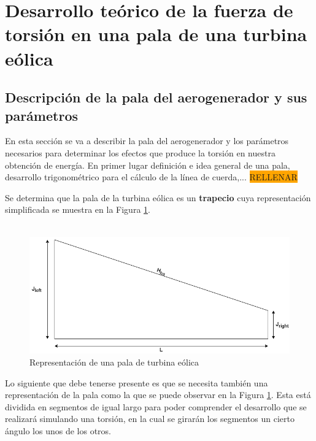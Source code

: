 \section{Desarrollo teórico de la fuerza de torsión en una pala de una turbina eólica}

\subsection{Descripción de la pala del aerogenerador y sus parámetros}

En esta sección se va a describir la pala del aerogenerador y los parámetros necesarios para determinar los efectos que produce la torsión en nuestra obtención de energía. En primer lugar definición e idea general de una pala, desarrollo trigonométrico para el cálculo de la línea de cuerda,... \colorbox{orange}{RELLENAR}


Se determina que la pala de la turbina eólica es un \textbf{trapecio} cuya representación simplificada se muestra en la Figura \ref{fig:pala_simp}. \\\\




\begin{figure}[H]
    \centering
    \includegraphics[width=1\textwidth]{images/pala simple.drawio.png}
    \caption{Representación de una pala de turbina eólica}
    \label{fig:pala_simp}
\end{figure}


Lo siguiente que debe tenerse presente es que se necesita también una representación de la pala como la que se puede observar en la Figura \ref{fig:pala_simp}. Esta está dividida en segmentos de igual largo para poder comprender el desarrollo que se realizará simulando una torsión, en la cual se girarán los segmentos un cierto ángulo los unos de los otros.

